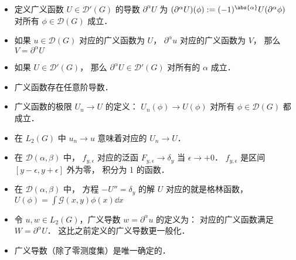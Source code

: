 \begin{itemize}
\item 定义广义函数 $U \in \mathcal D'(G)$ 的导数 $\partial^\alpha U$ 为 $(\partial^\alpha U)(\phi) := (-1)^{\abs{\alpha}} U(\partial^\alpha \phi)$ 对所有 $\phi\in\mathcal D(G)$ 成立．

\item 如果 $u \in\mathcal D(G)$ 对应的广义函数为 $U$， $\partial^\alpha u$ 对应的广义函数为 $V$， 那么 $V = \partial^\alpha U$

\item 如果 $U \in\mathcal D'(G)$， 那么 $\partial^\alpha U \in\mathcal D'(G)$ 对所有的 $\alpha$ 成立．

\item 广义函数存在任意阶导数．

\item 广义函数的极限 $U_n \to U$ 的定义： $U_n(\phi)\to U(\phi)$ 对所有 $\phi \in\mathcal D(G)$ 都成立．

\item 在 $L_2(G)$ 中 $u_n\to u$ 意味着对应的 $U_n \to U$．

\item 在 $\mathcal D(\alpha,\beta)$ 中， $f_{y,\epsilon}$ 对应的泛函 $F_{y, \epsilon}\to \delta_y$ 当 $\epsilon \to +0$． $f_{y,\epsilon}$ 是区间 $[y-\epsilon,y+\epsilon]$ 外为零， 积分为 1 的函数．

\item 在 $\mathcal D(\alpha,\beta)$ 中， 方程 $-U'' = \delta_y$ 的解 $U$ 对应的就是格林函数， $U(\phi) = \int \mathcal G(x, y) \phi(x) \dd{x}$

\item 令 $u, w \in L_2(G)$，广义导数 $w = \partial^\alpha u$ 的定义为： 对应的广义函数满足 $W = \partial^\alpha U$． 这比之前定义的广义导数更一般化．

\item 广义导数（除了零测度集）是唯一确定的．
\end{itemize}


